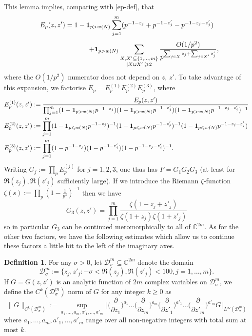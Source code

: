 \documentclass[12pt,a4paper,reqno]{amsart}
\numberwithin{equation}{section}
\theoremstyle{plain}
\theoremstyle{definition}
\newtheorem{definition}[subsection]{Definition}
\renewcommand{\leq}{\leqslant}
\renewcommand{\geq}{\geqslant}
\def\D{{\mathcal D}}
\def\C{{\mathbb C}}
\def\w{w}
\def\ni{\noindent}
\begin{document}
\ni This lemma implies, comparing with \eqref{ep-def}, that
\[ E_p(z,z') = 1 - {\bf 1}_{p > \w(N)} \sum_{j = 1}^m (p^{-1 - z_j} + p^{-1 - z'_j} - p^{-1 - z_j - z'_j}) \]
\begin{equation}\label{ep-est}
 \qquad\qquad\qquad\qquad + 
{\bf 1}_{p > \w(N)} \sum_{\substack{X,X' \subseteq \{1,\dots,m\} \\ |X \cup X'| \geq 2}} \frac{ O(1/p^2)}{p^{\sum_{j \in X} z_j + \sum_{j \in X'} z'_j}} ,
\end{equation}
where the $O(1/p^2)$ numerator does not depend on $z$, $z'$.
To take advantage of this expansion, we factorise $E_p = E_p^{(1)} E_p^{(2)} E_p^{(3)}$, where
\begin{align*}
E_p^{(1)}(z,z') &:=
 \frac{E_p(z,z')}{
 \prod_{j=1}^m(1 - {\bf 1}_{p > \w(N)} p^{-1 - z_j}) (1 - {\bf 1}_{p > \w(N)}p^{-1 - z'_j}) (1 - {\bf 1}_{p > \w(N)}p^{-1 - z_j - z'_j})^{-1}}\\
E_p^{(2)}(z,z') &:= \prod_{j=1}^m (1 - {\bf 1}_{p \leq \w(N)}p^{-1 - z_j})^{-1}(1 - {\bf 1}_{p \leq \w(N)} p^{-1 - z'_j})^{-1}(1 - {\bf 1}_{p \leq \w(N)} p^{-1 - z_j - z'_j}) \\
E_p^{(3)}(z,z') &:= \prod_{j=1}^m(1 - p^{-1 - z_j})(1 - p^{-1 - z'_j})(1 - p^{-1 - z_j - z'_j})^{-1}.
\end{align*}
Writing $G_j := \prod_p E_p^{(j)}$ for $j=1,2,3$, one thus has $F = G_1G_2G_3$ (at least for $\Re(z_j), \Re(z'_j)$ sufficiently large).  
If we introduce the Riemann $\zeta$-function $\zeta(s) := \prod_p (1 - \frac{1}{p^s})^{-1}$ then we have
\begin{equation}\label{g3-form}
 G_3(z,z') = \prod_{j=1}^m \frac{\zeta(1 + z_j + z'_j)}{\zeta(1 + z_j)\zeta(1 + z'_j)}
\end{equation}
so in particular $G_3$ can be continued meromorphically to all of $\C^{2m}$.  As for the other two factors, we have
the following estimates which allow us to continue these factors a little bit to the left of the imaginary axes.

\begin{definition}  For any $\sigma > 0$, let $\D^m_\sigma \subseteq\C^{2m}$ denote the domain
\[ \D^m_\sigma := \{z_j,z'_j : -\sigma < \Re(z_j),\Re(z'_j) < 100, j = 1,\dots,m\}.\]
If $G = G(z,z')$ is an analytic function of $2m$ complex variables on $\D^m_\sigma$,
we define the $C^k(\D^m_\sigma)$ norm of $G$ for any integer $k \geq 0$ as
$$ \| G \|_{C^k(\D^m_\sigma)} := \sup_{a_1,\dots,a_m,a'_1,\dots,a'_m}
\big\Vert \big(\frac{\partial}{\partial z_1}\big)^{a_1} \ldots \big(\frac{\partial}{\partial z_m}\big)^{a_m} \big(\frac{\partial}{\partial z'_1}\big)^{a'_1} \ldots \big(\frac{\partial}{\partial z'_m}\big)^{a'_m}
G \big\Vert_{L^\infty(\D^m_\sigma)}$$
where $a_1,\ldots,a_m,a'_1,\dots,a'_m$ range over all non-negative integers with total sum at most $k$.
\end{definition}
\end{document}

